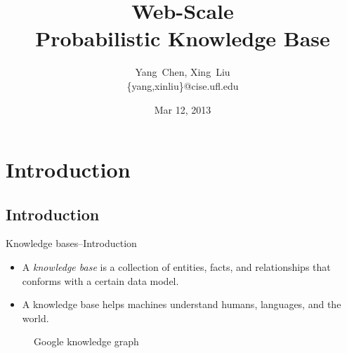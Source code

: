 \documentclass[onlymath,xcolor=pdftex,dvipsnames,table]{beamer}
\title[\probkb Web-Scale Probabilistic Knowledge Base]%
{\probkb Web-Scale\\Probabilistic Knowledge Base}
\author %
{Yang~Chen, Xing~Liu\\{\footnotesize{\{yang,xinliu\}@cise.ufl.edu}}}
\institute[University of Florida] %
{
  Computer and Information Science and Engineering\\
  University of Florida\\
}
\date{Mar 12, 2013} %
\let\oldemph\emph
\renewcommand{\emph}[1]{{\color{Blue}\oldemph{#1}}}
\begin{document}
\maketitle

\section{Introduction}
\subsection{Introduction}
\begin{frame}{Knowledge bases--Introduction}
\begin{itemize}
  \item A \emph{knowledge base} is a collection of entities, facts, and relationships that conforms with a certain data model.
  \item A knowledge base helps machines understand humans, languages, and the world.
\end{itemize}
\begin{figure}
  \centering
  \caption{Google knowledge graph}
\end{figure}
\end{frame}
\end{document}
